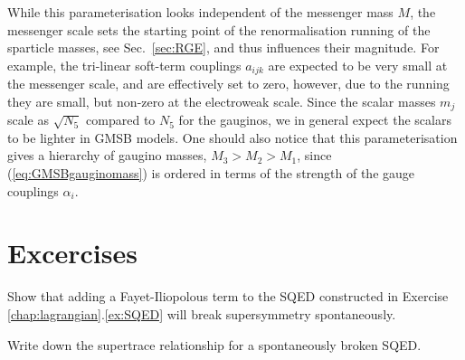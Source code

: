 \documentclass[notes.tex]{subfiles}
\begin{document}
While this parameterisation looks independent of the messenger mass $M$, the messenger scale sets the starting point of the renormalisation running of the sparticle masses, see Sec.~\ref{sec:RGE}, and thus influences their magnitude. For example, the tri-linear soft-term couplings $a_{ijk}$ are expected to be very small at the messenger scale, and are effectively set to zero, however, due to the running they are small, but non-zero at the electroweak scale. Since the scalar masses $m_j$ scale as $\sqrt{N_5}$ compared to $N_5$ for the gauginos, we in general expect the scalars to be lighter in GMSB models. One should also notice that this parameterisation  gives a hierarchy of gaugino masses, $M_3>M_2>M_1$, since (\ref{eq:GMSBgauginomass}) is ordered in terms of the strength of the gauge couplings $\alpha_i$. 





\section{Excercises}

\begin{Exercise}[]
Show that adding a Fayet-Iliopolous term to the SQED constructed in Exercise \ref{chap:lagrangian}.\ref{ex:SQED} will break supersymmetry spontaneously.
\end{Exercise}

\begin{Exercise}[]
Write down the supertrace relationship for a spontaneously broken SQED.
\end{Exercise}
\end{document}
